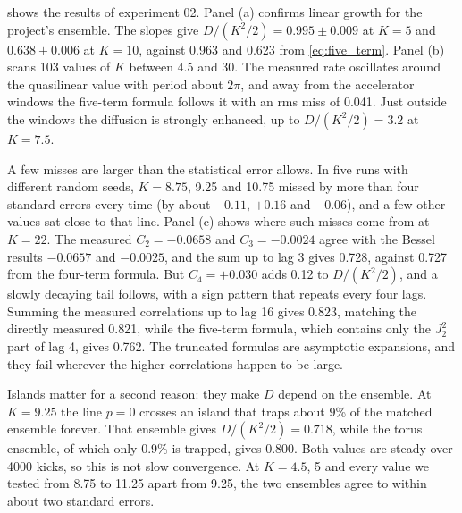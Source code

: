  shows the results of experiment 02. Panel (a) confirms linear growth for the
project's ensemble. The slopes give $D/(K^2/2) = 0.995 \pm 0.009$ at $K = 5$ and $0.638 \pm 0.006$ at
$K = 10$, against 0.963 and 0.623 from \cref{eq:five_term}. Panel (b) scans 103 values of $K$ between 4.5 and
30. The measured rate oscillates around the quasilinear value with period about $2\pi$, and away from the
accelerator windows the five-term formula follows it with an rms miss of 0.041. Just outside the windows
the diffusion is strongly enhanced, up to $D/(K^2/2) = 3.2$ at $K = 7.5$.

A few misses are larger than the statistical error allows. In five runs with different random seeds,
$K = 8.75$, 9.25 and 10.75 missed by more than four standard errors every time (by about $-0.11$, $+0.16$
and $-0.06$), and a few other values sat close to that line. Panel (c) shows where such misses come from at
$K = 22$. The measured $C_2 = -0.0658$ and $C_3 = -0.0024$ agree with the Bessel results $-0.0657$ and
$-0.0025$, and the sum up to lag 3 gives 0.728, against 0.727 from the four-term formula. But
$C_4 = +0.030$ adds 0.12 to
$D/(K^2/2)$, and a slowly decaying tail follows, with a sign pattern that repeats every four lags. Summing
the measured correlations up to lag 16 gives 0.823, matching the directly measured 0.821, while the
five-term formula, which contains only the $J_2^2$ part of lag 4, gives 0.762. The truncated formulas are
asymptotic expansions, and they fail wherever the higher correlations happen to be large.

Islands matter for a second reason: they make $D$ depend on the ensemble. At $K = 9.25$ the line $p = 0$
crosses an island that traps about 9\% of the matched ensemble forever. That ensemble gives
$D/(K^2/2) = 0.718$, while the torus ensemble, of which only 0.9\% is trapped, gives 0.800. Both values
are steady over 4000 kicks, so this is not slow convergence. At $K = 4.5$, 5 and every value we tested from
8.75 to 11.25 apart from 9.25, the two ensembles agree to within about two standard errors.
